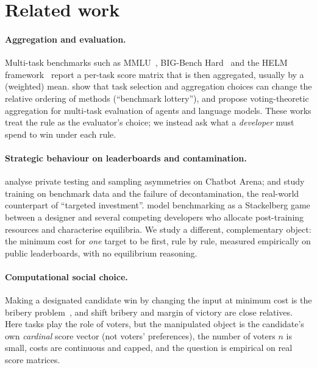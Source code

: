 \section{Related work}
\label{sec:related}
\paragraph{Aggregation and evaluation.} Multi-task benchmarks such as MMLU~\citep{hendrycks2021mmlu}, BIG-Bench Hard~\citep{suzgun2022bbh} and the HELM framework~\citep{liang2022helm} report a per-task score matrix that is then aggregated, usually by a (weighted) mean. \citet{dehghani2021lottery} show that task selection and aggregation choices can change the relative ordering of methods (``benchmark lottery''), and \citet{lanctot2023socialchoice} propose voting-theoretic aggregation for multi-task evaluation of agents and language models. These works treat the rule as the evaluator's choice; we instead ask what a \emph{developer} must spend to win under each rule.

\paragraph{Strategic behaviour on leaderboards and contamination.} \citet{singh2025illusion} analyse private testing and sampling asymmetries on Chatbot Arena; \citet{zhou2023cheater} and \citet{yang2023rephrased} study training on benchmark data and the failure of decontamination, the real-world counterpart of ``targeted investment''. \citet{chen2026incentives} model benchmarking as a Stackelberg game between a designer and several competing developers who allocate post-training resources and characterise equilibria. We study a different, complementary object: the minimum cost for \emph{one} target to be first, rule by rule, measured empirically on public leaderboards, with no equilibrium reasoning.

\paragraph{Computational social choice.} Making a designated candidate win by changing the input at minimum cost is the bribery problem~\citep{faliszewski2009bribery,faliszewski2009llull,faliszewski2016control,brandt2016handbook}, and shift bribery and margin of victory are close relatives. Here tasks play the role of voters, but the manipulated object is the candidate's own \emph{cardinal} score vector (not voters' preferences), the number of voters $n$ is small, costs are continuous and capped, and the question is empirical on real score matrices.
